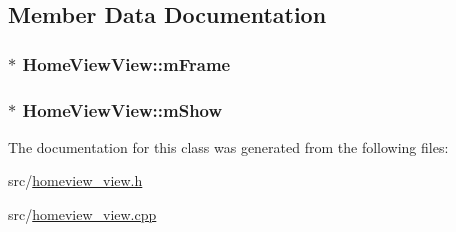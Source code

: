 \subsection{Member Data Documentation}
\hypertarget{a00108_acfb8f64c0cf233acc390a6c33840dec9}{
\subsubsection[{m\-Frame}]{$\ast$ Home\-View\-View\-::m\-Frame}}\label{a00108_acfb8f64c0cf233acc390a6c33840dec9}
\hypertarget{a00108_a5e70880481e8490d81a2e4e45146c7de}{
\subsubsection[{m\-Show}]{$\ast$ Home\-View\-View\-::m\-Show\hspace{0.3cm}{\ttfamily [private]}}}\label{a00108_a5e70880481e8490d81a2e4e45146c7de}


The documentation for this class was generated from the following files\-:\begin{DoxyCompactItemize}
\item 
src/\hyperlink{a00233}{homeview\-\_\-view.\-h}\item 
src/\hyperlink{a00232}{homeview\-\_\-view.\-cpp}\end{DoxyCompactItemize}
